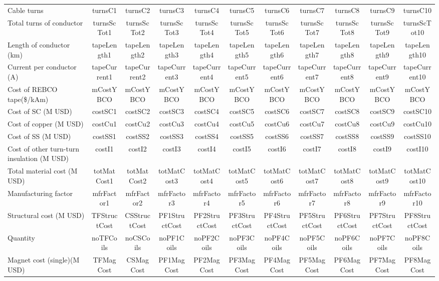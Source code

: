 \begin{table}[h]
{\begin{tabular}{lcccccccccc}
\hline
Cable turns & turnsC1 & turnsC2 & turnsC3 & turnsC4 & turnsC5 & turnsC6 & turnsC7 & turnsC8 & turnsC9 & turnsC10 \\
Total turns of conductor & turnsScTot1 & turnsScTot2 & turnsScTot3 & turnsScTot4 & turnsScTot5 & turnsScTot6 & turnsScTot7 & turnsScTot8 & turnsScTot9 & turnsScTot10 \\
Length of conductor (km) & tapeLength1 & tapeLength2 & tapeLength3 & tapeLength4 & tapeLength5 & tapeLength6 & tapeLength7 & tapeLength8 & tapeLength9 & tapeLength10 \\
Current per conductor (A) & tapeCurrent1 & tapeCurrent2 & tapeCurrent3 & tapeCurrent4 & tapeCurrent5 & tapeCurrent6 & tapeCurrent7 & tapeCurrent8 & tapeCurrent9 & tapeCurrent10 \\
\hline
Cost of REBCO tape(\$/kAm) & mCostYBCO & mCostYBCO & mCostYBCO & mCostYBCO & mCostYBCO & mCostYBCO & mCostYBCO & mCostYBCO & mCostYBCO & mCostYBCO \\
Cost of SC (M USD) & costSC1 & costSC2 & costSC3 & costSC4 & costSC5 & costSC6 & costSC7 & costSC8 & costSC9 & costSC10 \\
Cost of copper (M USD) & costCu1 & costCu2 & costCu3 & costCu4 & costCu5 & costCu6 & costCu7 & costCu8 & costCu9 & costCu10 \\
Cost of SS (M USD) & costSS1 & costSS2 & costSS3 & costSS4 & costSS5 & costSS6 & costSS7 & costSS8 & costSS9 & costSS10 \\
Cost of other turn-turn insulation (M USD) & costI1 & costI2 & costI3 & costI4 & costI5 & costI6 & costI7 & costI8 & costI9 & costI10 \\
Total material cost (M USD) & totMatCost1 & totMatCost2 & totMatCost3 & totMatCost4 & totMatCost5 & totMatCost6 & totMatCost7 & totMatCost8 & totMatCost9 & totMatCost10 \\
Manufacturing factor & mfrFactor1 & mfrFactor2 & mfrFactor3 & mfrFactor4 & mfrFactor5 & mfrFactor6 & mfrFactor7 & mfrFactor8 & mfrFactor9 & mfrFactor10 \\
Structural cost (M USD) & TFStructCost & CSStructCost & PF1StructCost & PF2StructCost & PF3StructCost & PF4StructCost & PF5StructCost & PF6StructCost & PF7StructCost & PF8StructCost \\
Quantity & noTFCoils & noCSCoils & noPF1Coils & noPF2Coils & noPF3Coils & noPF4Coils & noPF5Coils & noPF6Coils & noPF7Coils & noPF8Coils \\
Magnet cost (single)(M USD) & TFMagCost & CSMagCost & PF1MagCost & PF2MagCost & PF3MagCost & PF4MagCost & PF5MagCost & PF6MagCost & PF7MagCost & PF8MagCost \\

\end{tabular}}
\end{table}
